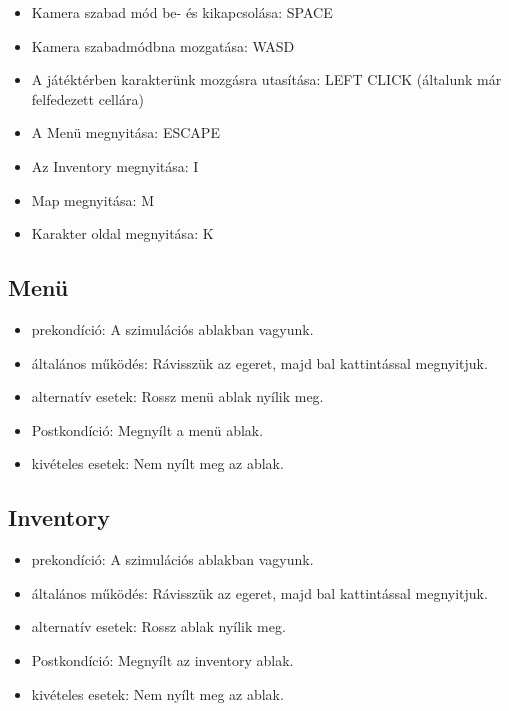 
\begin{itemize}
    \item Kamera szabad mód be- és kikapcsolása: SPACE
    \item Kamera szabadmódbna mozgatása: WASD
    \item A játéktérben karakterünk mozgásra utasítása: LEFT CLICK (általunk már felfedezett cellára)
    \item A Menü megnyitása: ESCAPE
    \item Az Inventory megnyitása: I
    \item Map megnyitása: M
    \item Karakter oldal megnyitása: K
\end{itemize}


\subsection{Menü}

\begin{itemize}
    \item prekondíció: A szimulációs ablakban vagyunk.
    \item általános működés: Rávisszük az egeret, majd bal kattintással megnyitjuk.
    \item alternatív esetek: Rossz menü ablak nyílik meg.
    \item Postkondíció: Megnyílt a menü ablak.
    \item kivételes esetek: Nem nyílt meg az ablak.
\end{itemize}

\subsection{Inventory}

\begin{itemize}
    \item prekondíció: A szimulációs ablakban vagyunk.
    \item általános működés: Rávisszük az egeret, majd bal kattintással megnyitjuk.
    \item alternatív esetek: Rossz ablak nyílik meg.
    \item Postkondíció: Megnyílt az inventory ablak.
    \item kivételes esetek: Nem nyílt meg az ablak.
\end{itemize}

